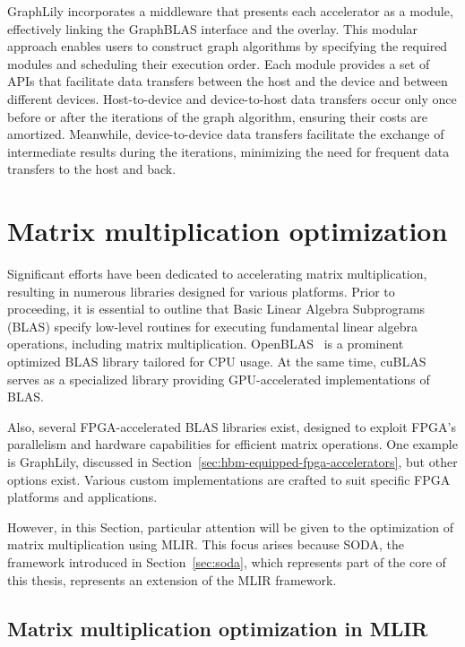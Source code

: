 GraphLily incorporates a middleware that presents each accelerator as a module, effectively linking the GraphBLAS interface and the overlay.
This modular approach enables users to construct graph algorithms by specifying the required modules and scheduling their execution order.
Each module provides a set of APIs that facilitate data transfers between the host and the device and between different devices.
Host-to-device and device-to-host data transfers occur only once before or after the iterations of the graph algorithm, ensuring their costs are amortized.
Meanwhile, device-to-device data transfers facilitate the exchange of intermediate results during the iterations, minimizing the need for frequent data transfers to the host and back.

\section{Matrix multiplication optimization}
\label{sec:matmul-optimization}%

Significant efforts have been dedicated to accelerating matrix multiplication, resulting in numerous libraries designed for various platforms.
Prior to proceeding, it is essential to outline that Basic Linear Algebra Subprograms (BLAS) specify low-level routines for executing fundamental linear algebra operations, including matrix multiplication.
OpenBLAS~\cite{openblas} is a prominent optimized BLAS library tailored for CPU usage.
At the same time, cuBLAS~\cite{cublas} serves as a specialized library providing GPU-accelerated implementations of BLAS\@.

Also, several FPGA-accelerated BLAS libraries exist, designed to exploit FPGA's parallelism and hardware capabilities for efficient matrix operations.
One example is GraphLily, discussed in Section~\ref{sec:hbm-equipped-fpga-accelerators}, but other options exist.
Various custom implementations are crafted to suit specific FPGA platforms and applications.

However, in this Section, particular attention will be given to the optimization of matrix multiplication using MLIR.
This focus arises because SODA, the framework introduced in Section~\ref{sec:soda}, which represents part of the core of this thesis, represents an extension of the MLIR framework.

\subsection{Matrix multiplication optimization in MLIR}
\label{subsec:matmul-opt-mlir}%

